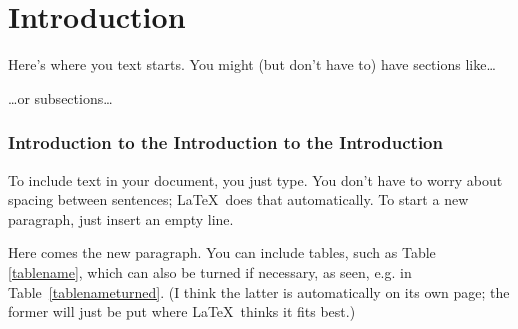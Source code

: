 \chapter{Introduction}

Here's where you text starts. You might (but don't have to) have sections like\dots

\dots or subsections\dots

\subsection{Introduction to the Introduction to the Introduction}

To include text in your document, you just type. You don't have to worry about spacing between sentences; \LaTeX \ does that automatically. 
To start a new paragraph, just insert an empty line.

Here comes the new paragraph. You can include tables, such as Table \ref{tablename}, which can also be turned if necessary, as seen, e.g. in Table~\ref{tablenameturned}. (I
think the latter is automatically on its own page; the former will just be put where \LaTeX \ thinks it fits best.)
